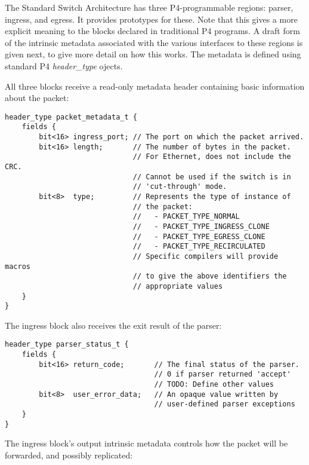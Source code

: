 \documentclass[12pt]{article}
\begin{document}
The Standard Switch Architecture has three P4-programmable regions: parser,
ingress, and egress.  It provides prototypes for these.  Note that this gives
a more explicit meaning to the blocks declared in traditional P4 programs.
A draft form of the intrinsic metadata associated with the various interfaces
to these regions is given next, to give more detail on how this works.
The metadata is defined using standard P4 \textit{header_type} ojects.


All three blocks receive a read-only metadata header containing basic
information about the packet:

\begin{lstlisting}[style=P4style]
header_type packet_metadata_t {
    fields {
        bit<16> ingress_port; // The port on which the packet arrived.
        bit<16> length;       // The number of bytes in the packet. 
                              // For Ethernet, does not include the CRC. 
                              // Cannot be used if the switch is in
                              // 'cut-through' mode.
        bit<8>  type;         // Represents the type of instance of
                              // the packet: 
                              //   - PACKET_TYPE_NORMAL
                              //   - PACKET_TYPE_INGRESS_CLONE
                              //   - PACKET_TYPE_EGRESS_CLONE
                              //   - PACKET_TYPE_RECIRCULATED
                              // Specific compilers will provide macros
                              // to give the above identifiers the
                              // appropriate values
    }
}
\end{lstlisting}

The ingress block also receives the exit result of the parser: 

\begin{lstlisting}[style=P4style]
header_type parser_status_t {
    fields {
        bit<16> return_code;       // The final status of the parser.
                                   // 0 if parser returned 'accept'
                                   // TODO: Define other values 
        bit<8>  user_error_data;   // An opaque value written by
                                   // user-defined parser exceptions
    }
}
\end{lstlisting}

The ingress block's output intrinsic metadata controls how the packet will be
forwarded, and possibly replicated:
\end{document}
